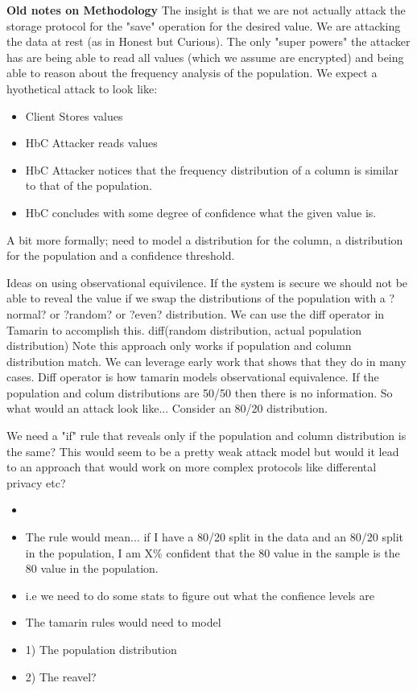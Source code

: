 \documentclass[journal]{IEEEtran}
\begin{document}
\textbf{Old notes on Methodology}
The insight is that we are not actually attack the storage protocol for the  "save" operation for the desired value. We are attacking the data at rest (as in Honest but Curious).
The only "super powers" the attacker has are being able to read all values (which we assume are encrypted) and being able to reason about the frequency analysis of the population.
We expect a hyothetical attack to look like:
\begin{itemize}
\item Client Stores values 
\item HbC Attacker reads values
\item HbC Attacker notices that the frequency distribution of a column is similar to that of the population.
\item HbC concludes with some degree of confidence what the  given value is. 
\end{itemize}

A bit more formally; need to model a distribution for the column, a distribution for the population and a confidence threshold.



Ideas on using observational equivilence.
If the system is secure we should not be able to reveal the value if we swap the distributions of the population with a ?normal? or ?random? or ?even? distribution. We can use the diff operator in Tamarin to accomplish this. 
diff(random distribution, actual population distribution) Note this approach only works if population and column distribution match. We can leverage early work that shows that they do in many cases. Diff operator is how tamarin models observational equivalence. 
If the population and colum distributions are 50/50 then there is no information. So what would an attack look like...
Consider an 80/20 distribution.

We need a "if" rule that reveals only if the population and column distribution is the same? This would seem to be a pretty weak attack model but would it lead to an approach that would work on more complex protocols like differental privacy etc?
\begin{itemize}
\item 
\item The rule would mean... if I have a 80/20 split in the data and an 80/20 split in the population, I am X\% confident that the 80 value in the sample is the 80 value in the population.
\item i.e we need to do some stats to figure out what the confience levels are
\item The tamarin rules would need to model
\item 1) The population distribution
\item 2) The reavel?
\end{itemize}
\end{document}
